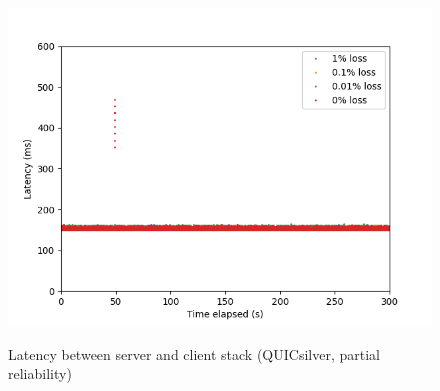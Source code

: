 \documentclass{mpaper}
\begin{document}
\begin{figure}
{   \includegraphics[scale=0.5]{images/graphics-partial/150ms-stack-latencies-combined-PARTIAL.png}
   \label{stack-par-150}
 }
 \caption{Latency between server and client stack (QUICsilver, partial reliability)}
 \label{stack-par}
\end{figure}
\end{document}
